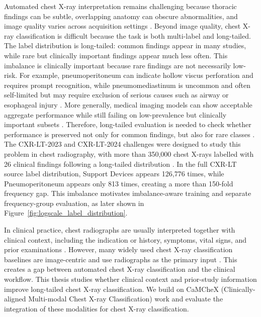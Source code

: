 Automated chest X-ray interpretation remains challenging because thoracic findings can be subtle, overlapping anatomy can obscure abnormalities, and image quality varies across acquisition settings \cite{irmici2023cxr_emergency_ai}. Beyond image quality, chest X-ray classification is difficult because the task is both multi-label and long-tailed. The label distribution is long-tailed: common findings appear in many studies, while rare but clinically important findings appear much less often. This imbalance is clinically important because rare findings are not necessarily low-risk. For example, pneumoperitoneum can indicate hollow viscus perforation and requires prompt recognition, while pneumomediastinum is uncommon and often self-limited but may require exclusion of serious causes such as airway or esophageal injury \cite{sureka2015pneumoperitoneum,iteen2023pneumomediastinum}. More generally, medical imaging models can show acceptable aggregate performance while still failing on low-prevalence but clinically important subsets \cite{oakdenrayner2020hidden}. Therefore, long-tailed evaluation is needed to check whether performance is preserved not only for common findings, but also for rare classes \cite{holste2022longtailcxr}. The CXR-LT-2023 and CXR-LT-2024 challenges were designed to study this problem in chest radiography, with more than 350,000 chest X-rays labelled with 26 clinical findings following a long-tailed distribution \cite{holste2024cxrlt}. In the full CXR-LT source label distribution, Support Devices appears 126,776 times, while Pneumoperitoneum appears only 813 times, creating a more than 150-fold frequency gap. This imbalance motivates imbalance-aware training and separate frequency-group evaluation, as later shown in Figure~\ref{fig:logscale_label_distribution}.

In clinical practice, chest radiographs are usually interpreted together with clinical context, including the indication or history, symptoms, vital signs, and prior examinations \cite{acr2025communication,jacenkow2022indication,sloan2025camchex}. However, many widely used chest X-ray classification baselines are image-centric and use radiographs as the primary input \cite{irvin2019chexpert,johnson2019mimiccxr}. This creates a gap between automated chest X-ray classification and the clinical workflow. This thesis studies whether clinical context and prior-study information improve long-tailed chest X-ray classification. We build on CaMCheX (Clinically-aligned Multi-modal Chest X-ray Classification) work \cite{sloan2025camchex} and evaluate the integration of these modalities for chest X-ray classification.

